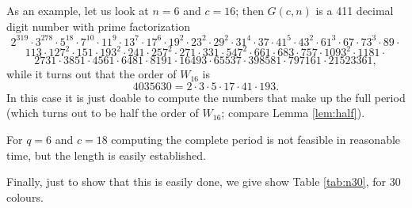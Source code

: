 \begin{example}
As an example, let us look at $n=6$ and $c=16$; then $G(c,n)$ is a 411 decimal
digit number with prime factorization
$$2^{319} \cdot 3^{278} \cdot 5^{18} \cdot 7^{10} \cdot 11^9
 \cdot 13^7 \cdot 17^6 \cdot 19^2 \cdot 23^2 \cdot 29^2 \cdot 31^4 \cdot 37 \cdot 41^5 \cdot 43^2 \cdot 61^3 \cdot 67 \cdot 73^3 \cdot 89 \cdot$$
$$113\cdot 127^2 \cdot 151 \cdot 193^2 \cdot 241 \cdot 257^2 \cdot 271 \cdot 331 \cdot 547^2 \cdot 661 \cdot 683 \cdot 757 \cdot 1093^2 \cdot 1181 \cdot$$
$$ 2731 \cdot 3851 \cdot 4561 \cdot 6481 \cdot 8191 \cdot 16493 \cdot 65537 \cdot 398581 \cdot 797161 \cdot 21523361,$$
while it turns out that the order of $W_{16}$ is 
$$4035630=2 \cdot 3 \cdot 5 \cdot 17 \cdot 41 \cdot 193.$$
In this case it is just doable to compute the numbers that make up
the full period (which turns out to be half the order of $W_{16}$;
compare Lemma \ref{lem:half}).

For $q=6$ and $c=18$ computing the complete period is not feasible
in reasonable time, but the length is easily established.
\end{example}
Finally, just to show that this is easily done, we give
show Table \ref{tab:n30}, for 30 colours.


